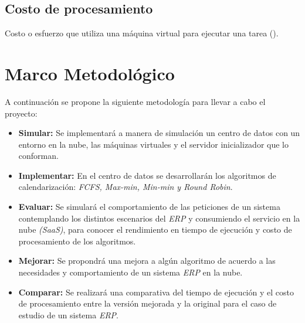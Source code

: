 \subsection*{Costo de procesamiento}

Costo o esfuerzo que utiliza una máquina virtual para ejecutar una tarea (\cite{redhat}). 

\newpage

\section{Marco Metodol\'ogico}

A continuaci\'on se propone la siguiente metodolog\'ia para llevar a cabo el proyecto:

\begin{itemize}
	\item \textbf{Simular:} Se implementar\'a a manera de simulaci\'on un centro de datos con un entorno en la nube, las m\'aquinas virtuales y el servidor inicializador que lo conforman.
	\item \textbf{Implementar:} En el centro de datos se desarrollar\'an los algoritmos de calendarizaci\'on: \textit{FCFS, Max-min, Min-min y Round Robin}.
	\item \textbf{Evaluar:} Se simular\'a el comportamiento de las peticiones de un sistema contemplando los distintos escenarios del \textit{ERP} y consumiendo el servicio en la nube \textit{(SaaS)}, para conocer el rendimiento en tiempo de ejecuci\'on y costo de procesamiento de los algoritmos.
	\item \textbf{Mejorar:} Se propondr\'a una mejora a alg\'un algoritmo de acuerdo a las necesidades y comportamiento de un sistema \textit{ERP} en la nube.
	\item \textbf{Comparar:} Se realizar\'a una comparativa del tiempo de ejecuci\'on y el costo de procesamiento entre la versi\'on mejorada y la original para el caso de estudio de un sistema \textit{ERP}.
\end{itemize}




